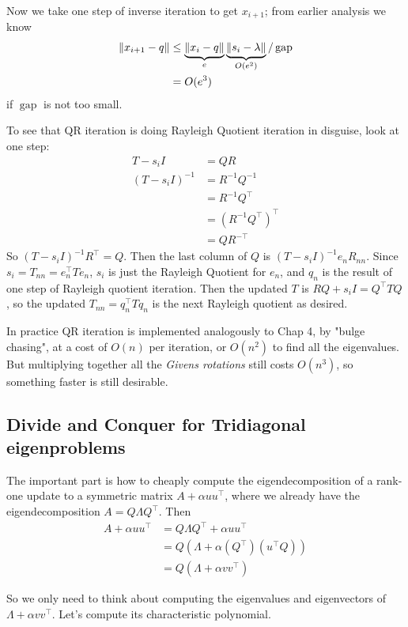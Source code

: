 \documentclass[11pt]{article}
\numberwithin{equation}{section}
\begin{document}
Now we take one step of inverse iteration to get $x_{i+1}$; from earlier analysis we know \begin{align*}
    \left\| x_{i+1} - q \right\| &\leq \underbrace{\left\| x_{i} - q \right\|}_{e} \underbrace{\left\| s_i - \lambda \right\|}_{O(e^2)} / \operatorname{gap} \\
    &= O(e^3)
\end{align*}
if $\operatorname{gap}$ is not too small.

To see that QR iteration is doing Rayleigh Quotient iteration in disguise, look at one step:
\begin{align*}
    T-s_{i} I &= Q R \\
    (T-s_{i} I)^{-1} &= R^{-1} Q^{-1} \\
    &= R^{-1} Q^{\top} \\
    &= \left( R^{-1} Q^{\top} \right)^{\top} \\
    &= Q R^{-\top}
\end{align*}
So $(T-s_{i} I)^{-1} R^{\top}=Q$. Then the last column of $Q$ is $(T-s_{i} I)^{-1} e_n R_{nn}$. 
Since $s_i = T_{nn} = e_n^\top T e_n$, $s_i$ is just the Rayleigh Quotient for $e_n$, and $q_n$ is the result of one step of Rayleigh quotient iteration.
Then the updated $T$ is $RQ + s_i I = Q^\top TQ$, so the updated $T_{nn} = q_n^\top T q_n$ is the next Rayleigh quotient as desired.

In practice QR iteration is implemented analogously to Chap 4, by "bulge chasing", at a cost of $O(n)$ per iteration, or $O(n^2)$ to find all the eigenvalues. 
But multiplying together all the \textit{Givens rotations} still costs $O(n^3)$, so something faster is still desirable.

\subsection{Divide and Conquer for Tridiagonal eigenproblems}
The important part is how to cheaply compute the eigendecomposition of a rank-one update to a symmetric matrix $A + \alpha uu^\top$,
where we already have the eigendecomposition $A = Q \Lambda Q^\top$. Then \begin{align*}
    A + \alpha uu^\top &= Q \Lambda Q^\top + \alpha uu^\top \\
    &= Q \left( \Lambda + \alpha (Q^\top) (u^\top Q) \right) \\
    &= Q \left( \Lambda + \alpha vv^\top \right)
\end{align*}

So we only need to think about computing the eigenvalues and eigenvectors of $\Lambda + \alpha vv^\top$. Let's compute its characteristic polynomial.
\end{document}
